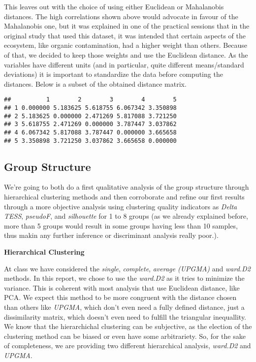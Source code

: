 \documentclass[]{article}
\begin{document}
This leaves out with the choice of using either Euclidean or Mahalanobis
distances. The high correlations shown above would advocate in favour of
the Mahalanobis one, but it was explained in one of the practical
sessions that in the original study that used this dataset, it was
intended that certain aspects of the ecosystem, like organic
contamination, had a higher weight than others. Because of that, we
decided to keep those weights and use the Euclidean distance. As the
variables have different units (and in particular, quite different
means/standard deviations) it is important to standardize the data
before computing the distances. Below is a subset of the obtained
distance matrix.

\begin{verbatim}
##          1        2        3        4        5
## 1 0.000000 5.183625 5.618755 6.067342 3.350898
## 2 5.183625 0.000000 2.471269 5.817088 3.721250
## 3 5.618755 2.471269 0.000000 3.787447 3.037862
## 4 6.067342 5.817088 3.787447 0.000000 3.665658
## 5 3.350898 3.721250 3.037862 3.665658 0.000000
\end{verbatim}

\subsection{Group Structure}\label{group-structure}

We're going to both do a first qualitative analysis of the group
structure through hierarchical clustering methods and then corroborate
and refine our first results through a more objective analysis using
clustering quality indicators as \emph{Delta TESS}, \emph{pseudoF}, and
\emph{silhouette} for 1 to 8 groups (as we already explained before,
more than 5 groups would result in some groups having less than 10
samples, thus makin any further inference or discriminant analysis
really poor.).

\textbf{Hierarchical Clustering}

At class we have considered the \emph{single}, \emph{complete},
\emph{average (UPGMA)} and \emph{ward.D2} methods. In this report, we
chose to use the \emph{ward.D2} as it tries to minimize the variance.
This is coherent with most analysis that use Euclidean distance, like
PCA. We expect this method to be more congruent with the distance chosen
than others like \emph{UPGMA}, which don't even need a fully defined
distance, just a dissimilarity matrix, which doesn't even need to
fulfill the triangular inequallity. We know that the hierarchichal
clustering can be subjective, as the election of the clustering method
can be biased or even have some arbitrariety. So, for the sake of
completeness, we are providing two different hierarchical analysis,
\emph{ward.D2} and \emph{UPGMA}.
\end{document}
